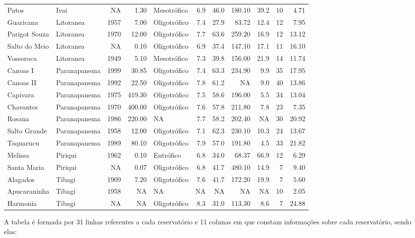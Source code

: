 \documentclass[
]{book}
\begin{document}
\begin{table}
\begin{tabular}{llrrlrrrrrr}
Patos & Ivai & NA & 1.30 & Mesotrófico & 6.9 & 46.0 & 180.10 & 39.2 & 10 & 4.71\\
\addlinespace
Guaricana & Litoranea & 1957 & 7.00 & Oligotrófico & 7.4 & 27.9 & 83.72 & 12.4 & 12 & 7.95\\
Parigot Souza & Litoranea & 1970 & 12.00 & Oligotrófico & 7.7 & 63.6 & 259.20 & 16.9 & 12 & 13.12\\
Salto do Meio & Litoranea & NA & 0.10 & Oligotrófico & 6.9 & 37.4 & 147.10 & 17.1 & 11 & 16.10\\
Vossoroca & Litoranea & 1949 & 5.10 & Mesotrófico & 7.3 & 39.8 & 156.00 & 21.9 & 14 & 11.74\\
Canoas I & Paranapanema & 1999 & 30.85 & Oligotrófico & 7.4 & 63.3 & 234.90 & 9.9 & 35 & 17.95\\
\addlinespace
Canoas II & Paranapanema & 1992 & 22.50 & Oligotrófico & 7.8 & 61.2 & NA & 9.0 & 40 & 13.86\\
Capivara & Paranapanema & 1975 & 419.30 & Oligotrófico & 7.5 & 58.6 & 196.00 & 5.5 & 34 & 13.04\\
Chavantes & Paranapanema & 1970 & 400.00 & Oligotrófico & 7.6 & 57.8 & 211.80 & 7.8 & 23 & 7.35\\
Rosana & Paranapanema & 1986 & 220.00 & NA & 7.7 & 58.2 & 202.40 & NA & 30 & 20.92\\
Salto Grande & Paranapanema & 1958 & 12.00 & Oligotrófico & 7.1 & 62.3 & 230.10 & 10.3 & 24 & 13.67\\
\addlinespace
Taquarucu & Paranapanema & 1989 & 80.10 & Oligotrófico & 7.9 & 57.0 & 191.80 & 4.5 & 33 & 21.82\\
Melissa & Piriqui & 1962 & 0.10 & Eutrófico & 6.8 & 34.0 & 68.37 & 66.9 & 12 & 6.29\\
Santa Maria & Piriqui & NA & 0.07 & Oligotrófico & 6.8 & 41.7 & 480.10 & 14.9 & 7 & 9.40\\
Alagados & Tibagi & 1909 & 7.20 & Oligotrófico & 7.6 & 41.7 & 172.20 & 19.9 & 7 & 5.60\\
Apucaraninha & Tibagi & 1958 & NA & NA & NA & NA & NA & NA & 10 & 2.05\\
\addlinespace
Harmonia & Tibagi & NA & NA & Oligotrófico & 8.3 & 31.0 & 113.30 & 8.6 & 7 & 24.88\\
\bottomrule
\end{tabular}
\endgroup{}
\end{table}

A tabela é formada por 31 linhas referentes a cada reservatório e 11 colunas em que constam informações sobre cada reservatório, sendo elas:
\end{document}
